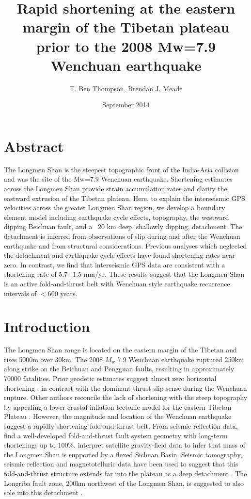 \documentclass[12pt]{article}
\title{Rapid shortening at the eastern margin of the Tibetan plateau prior to the 2008 Mw=7.9 Wenchuan earthquake}
\author{T. Ben Thompson, Brendan J. Meade}
\date{September 2014}
\begin{document}
\maketitle

\section{Abstract}
The Longmen Shan is the steepest topographic front of the India-Asia collision and was the site of the Mw=7.9 Wenchuan earthquake. Shortening estimates across the Longmen Shan provide strain accumulation rates and clarify the eastward extrusion of the Tibetan plateau. Here, to explain the interseismic GPS velocities across the greater Longmen Shan region, we develop a boundary element model including earthquake cycle effects, topography, the westward dipping Beichuan fault, and a ~20 km deep, shallowly dipping, detachment. The detachment is inferred from observations of slip during and after the Wenchuan earthquake and from structural considerations. Previous analyses which neglected the detachment and earthquake cycle effects have found shortening rates near zero. In contrast, we find that interseismic GPS data are consistent with a shortening rate of 5.7$\pm$1.5 mm/yr. These results suggest that the Longmen Shan is an active fold-and-thrust belt with Wenchuan style earthquake recurrence intervals of $<$600 years.

\section{Introduction}
The Longmen Shan range is located on the eastern margin of the Tibetan and rises 5000m over 30km.  The 2008 $M_{\textrm{w}}$ 7.9 Wenchuan earthquake ruptured 250km along strike on the Beichuan and Pengguan faults, resulting in approximately 70000 fatalities. Prior geodetic estimates suggest almost zero horizontal shortening \citep{king97, chen00, shen05, Meade07c, Loveless2011}, in contrast with the dominant thrust slip-sense during the Wenchuan rupture.  Other authors reconcile the lack of shortening with the steep topography by appealing a lower crustal inflation tectonic model for the eastern Tibetan Plateau \citep{royden97, bird91, Burchfiel2008a}. However, the magnitude and location of the Wenchuan earthquake suggest a rapidly shortening fold-and-thrust belt. From seismic reflection data, \citet{hubbard09} find a well-developed fold-and-thrust fault system geometry with long-term shortenings up to 100\%. \citet{Fielding2012a} interpret satellite gravity-field data to infer that mass of the Longmen Shan is supported by a flexed Sichuan Basin. Seismic tomography, seismic reflection and magnetotelluric data have been used to suggest that this fold-and-thrust structure extends far into the plateau as a deep detachment \citep{Zhang2009, Zhao2012, Guo2013}. The Longriba fault zone, 200km northwest of the Longmen Shan, is suggested to also sole into this detachment \citep{Xu2008, Ren2013}.
\end{document}
